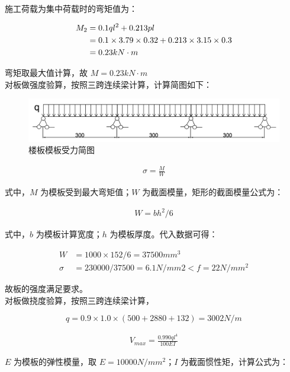 施工荷载为集中荷载时的弯矩值为：

\begin{align}
    M_2&=0.1ql^2+0.213pl\\
    &=0.1\times 3.79\times 0.32+0.213\times 3.15\times 0.3 \notag\\
    &=0.23 kN \cdot m \notag
\end{align}

弯矩取最大值计算，故 $M=0.23kN\cdot m$\\

对板做强度验算，按照三跨连续梁计算，计算简图如下：

\begin{figure}[thbp!]
    \centering
    \includegraphics[width=1.0\linewidth]{figure/c5f1.png}
    \caption{楼板模板受力简图}
    \label{fig:c5f1}
\end{figure}


\begin{align}
    \label{fx:5.1}
    \sigma =\frac{M}{W}
\end{align}

式中，$M$ 为模板受到最大弯矩值；$W$ 为截面模量，矩形的截面模量公式为：

\begin{align}
    \label{fx:5.2}
    W=bh^2/6
\end{align}

式中，$b$ 为模板计算宽度；$h$ 为模板厚度。代入数据可得：

\begin{align*}
    W&=1000\times 152/6=37500 mm^3\\
    \sigma &=230000/37500=6.1 N/mm2<f=22 N/mm^2
\end{align*}

故板的强度满足要求。\\

对板做挠度验算，按照三跨连续梁计算，

\[q=0.9\times 1.0\times (500+2880+132)=3002 N/m\]

\begin{align}
    \label{fx:5.3}
    V_{max}=\frac{0.990ql^4}{100EI}
\end{align}

$E$ 为模板的弹性模量，取 $E=10000 N/mm^2$；$I$ 为截面惯性矩，计算公式为：

